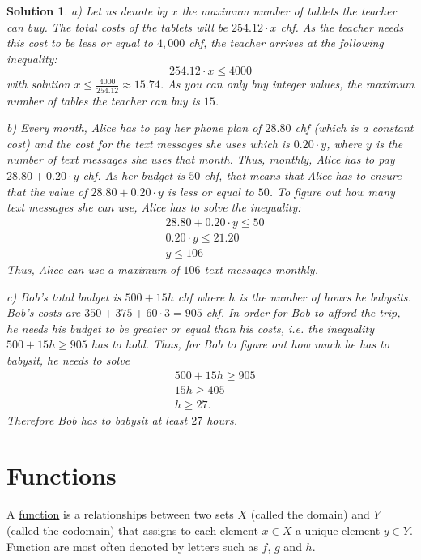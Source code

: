 \documentclass[12pt]{article}
\newtheorem{sol}[prop]{Solution}
\begin{document}
\begin{sol}
\item[a)] Let us denote by $x$ the maximum number of tablets the teacher can buy. The total costs of the tablets will be $254.12\cdot x$ chf. As the teacher needs this cost to be less or equal to $4,000$ chf, the teacher arrives at the following inequality:
$$254.12\cdot x\leq 4000$$
with solution $x\leq \frac{4000}{254.12}\approx 15.74$. As you can only buy integer values, the maximum number of tables the teacher can buy is $15$.
\item[b)] Every month, Alice has to pay her phone plan of $28.80$ chf (which is a constant cost) and the cost for the text messages she uses which is $0.20\cdot y$, where $y$ is the number of text messages she uses that month. Thus, monthly, Alice has to pay $28.80+ 0.20\cdot y$ chf. As her budget is $50$ chf, that means that Alice has to ensure that the value of $28.80+ 0.20\cdot y$ is less or equal to $50$. To figure out how many text messages she can use, Alice has to solve the inequality:
\begin{equation*}
\begin{split}
& 28.80+ 0.20\cdot y\leq 50 \\
& 0.20\cdot y\leq 21.20\\
&y\leq 106
\end{split}
\end{equation*}
Thus, Alice can use a maximum of $106$ text messages monthly.
\item[c)] Bob's total budget is $500+15h$ chf where $h$ is the number of hours he babysits. Bob's costs are $350+375+60\cdot 3=905$ chf. In order for Bob to afford the trip, he needs his budget to be greater or equal than his costs, i.e. the inequality $500+15h\geq 905$ has to hold. Thus, for Bob to figure out how much he has to babysit, he needs to solve
\begin{equation*}
\begin{split}
& 500+15h\geq 905 \\
& 15h\geq 405\\
&h\geq 27.
\end{split}
\end{equation*}
Therefore Bob has to babysit at least $27$ hours.
\end{sol}

\section{Functions}
A \underline{function} is a relationships between two sets $X$ (called the domain) and $Y$ (called the codomain) that assigns to each element $x\in X$ a unique element $y\in Y$. Function are most often denoted by letters such as $f$, $g$ and $h$. 
\end{document}
